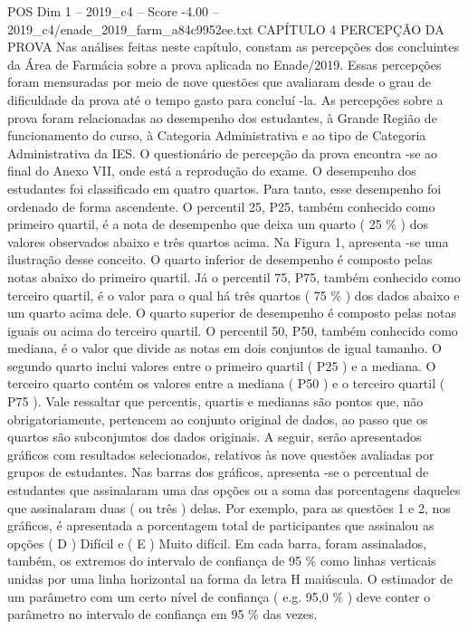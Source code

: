 \begin{textsample}{POS Dim 1 – 2019\_c4 – Score -4.00 – 2019\_c4/enade\_2019\_farm\_a84c9952ee.txt}  \label{ex:f1_pos_349}
CAPÍTULO 4 PERCEPÇÃO DA PROVA Nas análises feitas neste capítulo, constam as percepções dos concluintes da Área de Farmácia sobre a prova aplicada no Enade/2019.
Essas percepções foram mensuradas por meio de nove questões que avaliaram desde o grau de dificuldade da prova até o tempo gasto para concluí -la.
As percepções sobre a prova foram relacionadas ao desempenho dos estudantes, à Grande Região de funcionamento do curso, à Categoria Administrativa e ao tipo de Categoria Administrativa da IES.
O questionário de percepção da prova encontra -se ao final do Anexo VII, onde está a reprodução do exame.
O desempenho dos estudantes foi classificado em quatro quartos.
Para tanto, esse desempenho foi ordenado de forma ascendente.
O percentil 25, P25, também conhecido como primeiro quartil, é a nota de desempenho que deixa um quarto ( 25 \% ) dos valores observados abaixo e três quartos acima.
Na Figura 1, apresenta -se uma ilustração desse conceito.
O quarto inferior de desempenho é composto pelas notas abaixo do primeiro quartil.
Já o percentil 75, P75, também conhecido como terceiro quartil, é o valor para o qual há três quartos ( 75 \% ) dos dados abaixo e um quarto acima dele.
O quarto superior de desempenho é composto pelas notas iguais ou acima do terceiro quartil.
O percentil 50, P50, também conhecido como mediana, é o valor que divide as notas em dois conjuntos de igual tamanho.
O segundo quarto inclui valores entre o primeiro quartil ( P25 ) e a mediana.
O terceiro quarto contém os valores entre a mediana ( P50 ) e o terceiro quartil ( P75 ).
Vale ressaltar que percentis, quartis e medianas são pontos que, não obrigatoriamente, pertencem ao conjunto original de dados, ao passo que os quartos são subconjuntos dos dados originais.
A seguir, serão apresentados gráficos com resultados selecionados, relativos às nove questões avaliadas por grupos de estudantes.
Nas barras dos gráficos, apresenta -se o percentual de estudantes que assinalaram uma das opções ou a soma das porcentagens daqueles que assinalaram duas ( ou três ) delas.
Por exemplo, para as questões 1 e 2, nos gráficos, é apresentada a porcentagem total de participantes que assinalou as opções ( D ) Difícil e ( E ) Muito difícil.
Em cada barra, foram assinalados, também, os extremos do intervalo de confiança de 95 \% como linhas verticais unidas por uma linha horizontal na forma da letra H maiúscula.
O estimador de um parâmetro com um certo nível de confiança ( e.g. 95,0 \% ) deve conter o parâmetro no intervalo de confiança em 95 \% das vezes.

\end{textsample}
